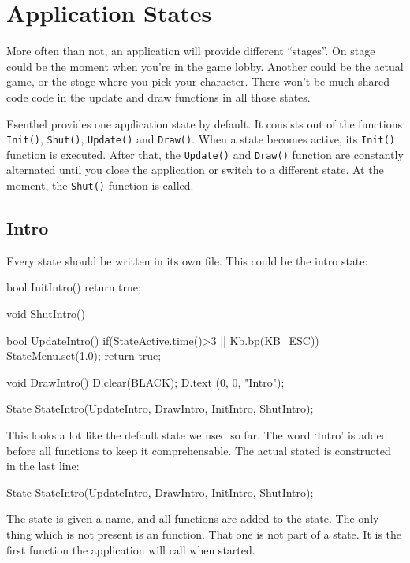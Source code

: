 \chapter{Application States}
\label{chapter:application_states}
More often than not, an application will provide different ``stages''. On stage could be the moment when you're in the game lobby. Another could be the actual game, or the stage where you pick your character. There won't be much shared code code in the update and draw functions in all those states.

Esenthel provides one application state by default. It consists out of the functions \texttt{Init()}, \texttt{Shut()}, \texttt{Update()} and \texttt{Draw()}. When a state becomes active, its \texttt{Init()}  function is executed. After that, the \texttt{Update()} and \texttt{Draw()} function are constantly alternated until you close the application or switch to a different state. At the moment, the  \texttt{Shut()} function is called.

\section{Intro}
Every state should be written in its own file. This could be the intro state:

\begin{code}
bool InitIntro() {return true;}

void ShutIntro() {}

bool UpdateIntro()
{
   if(StateActive.time()>3 || Kb.bp(KB_ESC)) {
      StateMenu.set(1.0);                    
   }
   return true;
}

void DrawIntro()
{
   D.clear(BLACK);
   D.text (0, 0, "Intro");
}

State StateIntro(UpdateIntro, DrawIntro, InitIntro, ShutIntro);
\end{code}

This looks a lot like the default state we used so far. The word `Intro' is added before all functions to keep it comprehensable. The actual stated is constructed in the last line:

\begin{code}
State StateIntro(UpdateIntro, DrawIntro, InitIntro, ShutIntro);
\end{code}

The state is given a name, and all functions are added to the state. The only thing which is not present is an  function. That one is not part of a state. It is the first function the application will call when started.

